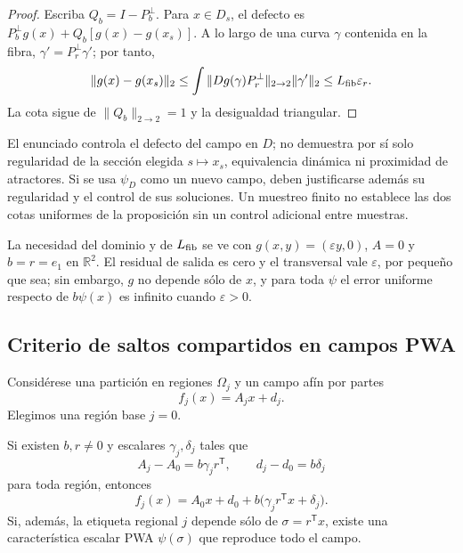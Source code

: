 \begin{proof}
Escriba \(Q_b=I-P_b^\perp\). Para \(x\in D_s\), el defecto es
\(P_b^\perp g(x)+Q_b[g(x)-g(x_s)]\). A lo largo de una curva \(\gamma\)
contenida en la fibra, \(\gamma'=P_r^\perp\gamma'\); por tanto,
\[
 \|g(x)-g(x_s)\|_2
 \le\int\|Dg(\gamma)P_r^\perp\|_{2\to2}\|\gamma'\|_2
 \le L_{\rm fib}\varepsilon_r.
\]
La cota sigue de \(\|Q_b\|_{2\to2}=1\) y la desigualdad triangular.
\end{proof}

El enunciado controla el defecto del campo en \(D\); no demuestra por sí solo
regularidad de la sección elegida \(s\mapsto x_s\), equivalencia dinámica ni
proximidad de atractores. Si se usa \(\psi_D\) como un nuevo campo, deben
justificarse además su regularidad y el control de sus soluciones. Un muestreo
finito no establece las dos cotas uniformes de la proposición sin un control
adicional entre muestras.

La necesidad del dominio y de \(L_{\rm fib}\) se ve con
\(g(x,y)=(\varepsilon y,0)\), \(A=0\) y \(b=r=e_1\) en
\(\mathbb R^2\). El residual de salida es cero y el transversal vale
\(\varepsilon\), por pequeño que sea; sin embargo, \(g\) no depende sólo de
\(x\), y para toda \(\psi\) el error uniforme respecto de
\(b\psi(x)\) es infinito cuando \(\varepsilon>0\).

\subsection{Criterio de saltos compartidos en campos PWA}
\label{sec:pwa-shared-jumps}

Considérese una partición en regiones \(\Omega_j\) y un campo afín por partes
\[
 f_j(x)=A_jx+d_j.
\]
Elegimos una región base \(j=0\).

\begin{proposition}
\label{prop:pwa-shared}
Si existen \(b,r\neq0\) y escalares \(\gamma_j,\delta_j\) tales que
\begin{equation}
 A_j-A_0=b\gamma_jr^{\mathsf T},\qquad
 d_j-d_0=b\delta_j
 \label{eq:th-pwa-jumps}
\end{equation}
para toda región, entonces
\begin{equation}
 f_j(x)=A_0x+d_0+b\bigl(\gamma_jr^{\mathsf T}x+\delta_j\bigr).
 \label{eq:th-pwa-realization}
\end{equation}
Si, además, la etiqueta regional \(j\) depende sólo de
\(\sigma=r^{\mathsf T}x\), existe una característica escalar PWA
\(\psi(\sigma)\) que reproduce todo el campo.
\end{proposition}

